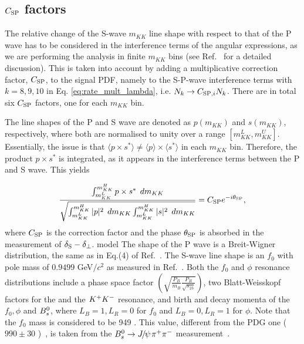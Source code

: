 \subsection{\texorpdfstring{$C_{\rm SP}$}{Csp} factors}
\label{sec:CSP}
The relative change of the S-wave $m_{KK}$ line shape with respect to that of the P wave has to be considered in the interference terms of the angular expressions, as we are
performing the analysis in finite $m_{KK}$ bins (see Ref.~\cite{xie_CSP_sfiterror} for a detailed discussion). This is taken into account by adding a multiplicative correction factor, $C_{\rm SP}$, to the signal PDF, namely to the S-P-wave interference terms with $k=8,9,10$ in Eq. \eqref{eq:rate_mult_lambda}, i.e. $N_{k}\rightarrow C_{{\rm SP},i} N_{k}$. There are in total six  $C_{\rm SP}$ factors, one for each $m_{KK}$ bin.

The line shapes of the P and S wave are denoted as $p(m_{KK})$ and $s(m_{KK})$, respectively, where both are normalised to unity over a range $[m_{KK}^L,m_{KK}^U]$.
Essentially, the issue is that $\langle p\times s^*\rangle \neq \langle p \rangle \times \langle s^*\rangle$ in each $m_{KK}$ bin. Therefore, the product $p \times s^*$ is integrated, as it appears in the interference terms between the P and S wave. This yields

\begin{equation}
\label{eq:CSP}
\frac{\int_{m_{KK}^L}^{m_{KK}^H} { p \times s^*}  \:\:d m_{KK}}
{\sqrt{\int_{m_{KK}^L}^{m_{KK}^H} { |p|^2}  \:\:d m_{KK} \int_{m_{KK}^L}^{m_{KK}^H} { |s|^2}  \:\:d m_{KK}}}
 = C_{\rm SP} e^{-i \theta_{\rm SP}},
\end{equation}
where $C_{\rm SP}$ is the correction factor and the phase $\theta_{\rm SP}$ is
absorbed in the measurement of  $\delta_{\rm S} - \delta _{\perp}$.%
model The shape of the P wave is a Breit-Wigner distribution, the same as in
Eq.(4) of Ref.~\cite{Liu:2241242}. The S-wave line shape is an $f_{0}$ with pole
mass of $0.9499$ GeV$/c^{2}$ as measured in Ref.~\cite{Liu:2241242}. Both the
$f_0$ and $\phi$ resonance distributions include a phase space factor $ \left (
\sqrt{\frac{P_B}{m_B}\frac{P_R}{\sqrt{s_{23}}}} \right )$, two Blatt-Weisskopf
factors for the \B and the $K^+K^-$ resonance, and birth and decay momenta of
the $f_0, \phi$ and $B^0_s$, where $L_B = 1, L_R = 0$ for $f_0$ and $L_B = 0, L_R
= 1$ for $\phi$. Note that the $f_0$ mass is considered to be 949 \mev. This
value, different from the PDG one ($990 \pm 30$ \mev)~\cite{PDG2017}, is taken
from the $B^0_s\to{\ensuremath{{J\mskip -3mu/\mskip -2mu\psi\mskip 2mu}}}\pi^+\pi^-$ measurement~\cite{Aaij:2014emv}.

